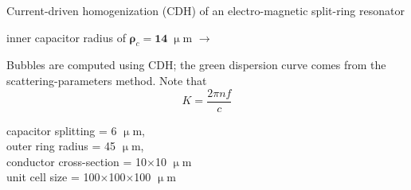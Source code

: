 \documentclass[t]{beamer} \usepackage[english]{babel} \usepackage[utf8]{inputenc} \usetheme{Frankfurt} %
\begin{document}
\begin{frame}[plain]{}%
\begin{columns}[T] %
	\begin{column}{.55\textwidth}
	\vspace{3mm}
	\noindent Current-driven homogenization (CDH) of an electro-magnetic split-ring resonator 
	\begin{exampleblock}\hfill inner capacitor radius of $\pmb\rho_c=\pmb{14}\;\upmu$m $\rightarrow$\end{exampleblock}
	\vspace{3mm}

	\noindent Bubbles are computed using CDH; the green dispersion curve comes from the scattering-parameters method. Note that $$K = \frac{2\pi n f}{c}$$
	\vspace{12mm}

	\small{capacitor splitting = 6 $\upmu$m,\\ outer ring radius = 45 $\upmu$m,\\ conductor cross-section = 10$\times$10 $\upmu$m\\ unit cell size = 100$\times$100$\times$100 $\upmu$m}
	\vspace{5mm}


\end{column}
\end{columns}
\end{frame}
\end{document}
